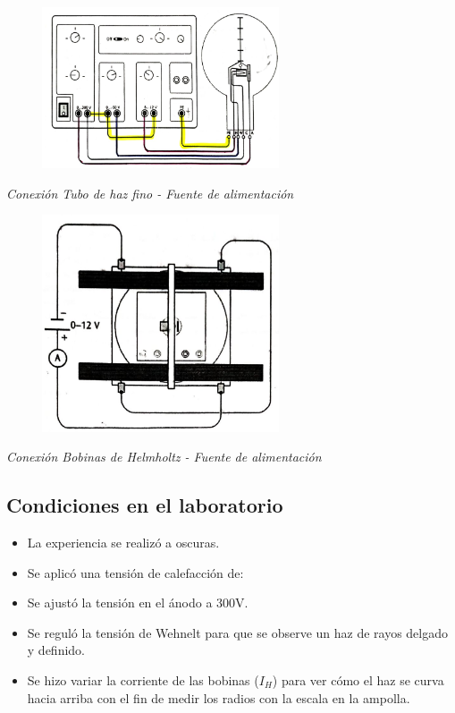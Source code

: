 \documentclass[a4paper]{article}
\begin{document}
        \begin{figure}[h!]
            \centering
            \includegraphics[width = 7cm] {../imagenes/esquemaConexionTuboDeHazFuenteAlim.png}
        \end{figure}

        \begin{center}
            \textit{Conexión Tubo de haz fino - Fuente de alimentación} \\
        \end{center}

        \begin{figure}[h!]
            \centering
            \includegraphics[width = 7cm] {../imagenes/esquemaConexionBobinasHelmholtzFuenteAlim.png}
        \end{figure}

        \begin{center}
            \textit{Conexión Bobinas de Helmholtz - Fuente de alimentación}
        \end{center}

    \subsection{Condiciones en el laboratorio}
        \begin{itemize}
            \item La experiencia se realizó a oscuras.
            \item Se aplicó una tensión de calefacción de: 
            \item Se ajustó la tensión en el ánodo a 300V.
            \item Se reguló la tensión de Wehnelt para que se observe un haz de rayos delgado y definido.
            \item Se hizo variar la corriente de las bobinas ($I_H$) para ver cómo el haz se curva hacia arriba con el fin de medir los radios con la escala en la ampolla.
        \end{itemize}
\end{document}
